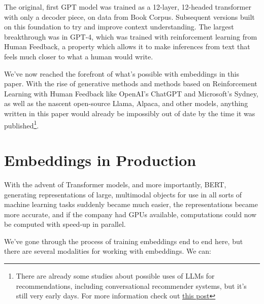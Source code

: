 \documentclass[11pt, table]{diazessay} %
\begin{document}
\begin{sloppypar}
The original, first GPT model was trained as a 12-layer, 12-headed transformer with only a decoder piece, on data from Book Corpus. Subsequent versions built on this foundation to try and improve context understanding. The largest breakthrough was in GPT-4, which was trained with reinforcement learning from Human Feedback, a property which allows it to make inferences from text that feels much closer to what a human would write. 

We've now reached the forefront of what's possible with embeddings in this paper. With the rise of generative methods and methods based on Reinforcement Learning with Human Feedback like OpenAI's ChatGPT and Microsoft's Sydney, as well as the nascent open-source Llama, Alpaca, and other models,  anything written in this paper would already be impossibly out of date by the time it was published\footnote{There are already some studies about possible uses of LLMs for recommendations, including conversational recommender systems, but it's still very early days. For more information check out \href{https://blog.reachsumit.com/posts/2023/05/tuning-llm-for-recsys/}{this post}}. 

\section{Embeddings in Production}

With the advent of Transformer models, and more importantly, BERT, generating representations of large, multimodal objects for use in all sorts of machine learning tasks suddenly became much easier, the representations became more accurate, and if the company had GPUs available, computations could now be computed with speed-up in parallel. 

We've gone through the process of training embeddings end to end here, but there are several modalities for working with embeddings. We can: 



\end{sloppypar}
\end{document}
